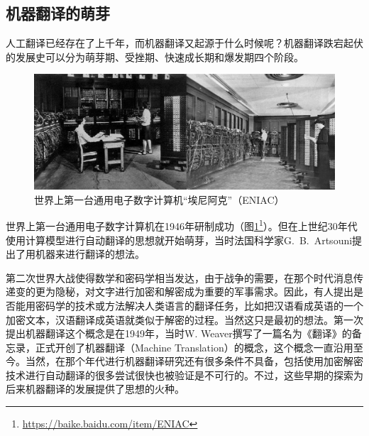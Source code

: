 
\subsection{机器翻译的萌芽}

\parinterval 人工翻译已经存在了上千年，而机器翻译又起源于什么时候呢？机器翻译跌宕起伏的发展史可以分为萌芽期、受挫期、快速成长期和爆发期四个阶段。

\begin{figure}[htp]
    \centering
\includegraphics[scale=0.25]{./Chapter1/Figures/figure-eniac.jpg}
    \caption{世界上第一台通用电子数字计算机``埃尼阿克''（ENIAC）}
    \label{fig:1-4}
\end{figure}

\parinterval 世界上第一台通用电子数字计算机在1946年研制成功（图\ref{fig:1-4}\footnote{\url{https://baike.baidu.com/item/ENIAC}}）。但在上世纪30年代使用计算模型进行自动翻译的思想就开始萌芽，当时法国科学家G.\ B.\ Artsouni提出了用机器来进行翻译的想法。

\parinterval 第二次世界大战使得数学和密码学相当发达，由于战争的需要，在那个时代消息传递变的更为隐秘，对文字进行加密和解密成为重要的军事需求。因此，有人提出是否能用密码学的技术或方法解决人类语言的翻译任务，比如把汉语看成英语的一个加密文本，汉语翻译成英语就类似于解密的过程。当然这只是最初的想法。第一次提出机器翻译这个概念是在1949年，当时W. Weaver撰写了一篇名为《翻译》的备忘录，正式开创了机器翻译（Machine Translation）的概念，这个概念一直沿用至今。当然，在那个年代进行机器翻译研究还有很多条件不具备，包括使用加密解密技术进行自动翻译的很多尝试很快也被验证是不可行的。不过，这些早期的探索为后来机器翻译的发展提供了思想的火种。


